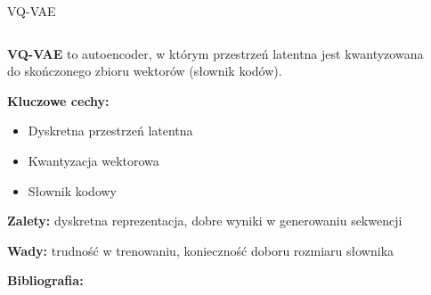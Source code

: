 \documentclass{beamer}
\begin{document}
\begin{frame}{VQ-VAE}
  \begin{columns}
    \begin{column}{0.6\textwidth}
    \textbf{VQ-VAE} to autoencoder, w którym przestrzeń latentna jest kwantyzowana do skończonego zbioru wektorów (słownik kodów).
    
    \medskip
    \textbf{Kluczowe cechy:}
    \begin{itemize}
    \item Dyskretna przestrzeń latentna
    \item Kwantyzacja wektorowa
    \item Słownik kodowy
    \end{itemize}
    
    \textbf{Zalety:} dyskretna reprezentacja, dobre wyniki w generowaniu sekwencji
    
    \textbf{Wady:} trudność w trenowaniu, konieczność doboru rozmiaru słownika
    
    \textbf{Bibliografia:} \cite{van2017neural}
    \end{column}
    \begin{column}{0.4\textwidth}
    \centering
    \end{column}
  \end{columns}
\end{frame}
\end{document}
